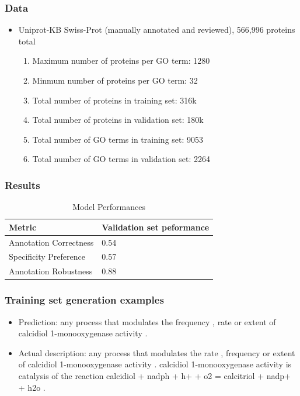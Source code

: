 \documentclass{beamer}
\begin{document}
\begin{frame}
    \frametitle{Data}
    \begin{itemize}
        \item Uniprot-KB Swiss-Prot (manually annotated and reviewed), 566,996 proteins total
        \begin{enumerate}
            \item Maximum number of proteins per GO term: 1280
            \item Minmum number of proteins per GO term: 32
            \item Total number of proteins in training set: 316k
            \item Total number of proteins in validation set: 180k
            \item Total number of GO terms in training set: 9053
            \item Total number of GO terms in validation set: 2264
        \end{enumerate}
    \end{itemize}
\end{frame}

\begin{frame}
\frametitle{Results}

\begin{table}
	\caption{Model Performances}
	\centering
    \begin{tabular}{p{}|p{}}
		\toprule
        Metric & Validation set peformance \\
		\midrule
        Annotation Correctness & 0.54 \\
        Specificity Preference & 0.57  \\
		Annotation Robustness & 0.88  \\
		\bottomrule
	\end{tabular}
	\label{tab:table}
\end{table}
\end{frame}

\begin{frame}
\frametitle{Training set generation examples}
\begin{itemize}
\item Prediction: any process that modulates the frequency , rate or extent of calcidiol 1-monooxygenase activity .
\item Actual description: any process that modulates the rate , frequency or extent of calcidiol 1-monooxygenase activity . calcidiol 1-monooxygenase activity is catalysis of the reaction calcidiol + nadph + h+ + o2 = calcitriol + nadp+ + h2o .
\end{itemize}
\end{frame}
\end{document}
